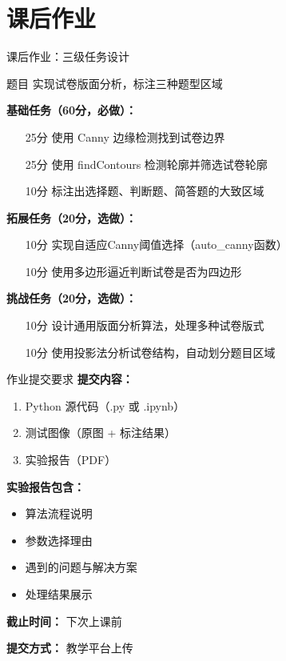 \section{课后作业}

\begin{frame}{课后作业：三级任务设计}
    \begin{block}{题目}
        实现试卷版面分析，标注三种题型区域
    \end{block}

    \textbf{基础任务（60分，必做）：}
    \begin{itemize}\itemsep=0pt
        \item[25分] 使用 Canny 边缘检测找到试卷边界
        \item[25分] 使用 findContours 检测轮廓并筛选试卷轮廓
        \item[10分] 标注出选择题、判断题、简答题的大致区域
    \end{itemize}

    \textbf{拓展任务（20分，选做）：}
    \begin{itemize}\itemsep=0pt
        \item[10分] 实现自适应Canny阈值选择（auto\_canny函数）
        \item[10分] 使用多边形逼近判断试卷是否为四边形
    \end{itemize}

    \textbf{挑战任务（20分，选做）：}
    \begin{itemize}\itemsep=0pt
        \item[10分] 设计通用版面分析算法，处理多种试卷版式
        \item[10分] 使用投影法分析试卷结构，自动划分题目区域
    \end{itemize}
\end{frame}

\begin{frame}{作业提交要求}
    \textbf{提交内容：}
    \begin{enumerate}
        \item Python 源代码（.py 或 .ipynb）
        \item 测试图像（原图 + 标注结果）
        \item 实验报告（PDF）
    \end{enumerate}

    \vspace{0.3cm}

    \textbf{实验报告包含：}
    \begin{itemize}
        \item 算法流程说明
        \item 参数选择理由
        \item 遇到的问题与解决方案
        \item 处理结果展示
    \end{itemize}

    \vspace{0.3cm}

    \textbf{截止时间：} 下次上课前

    \textbf{提交方式：} 教学平台上传
\end{frame}

